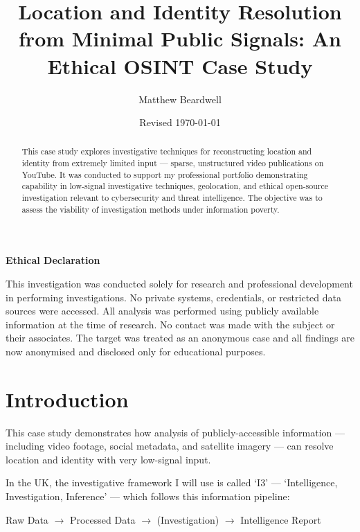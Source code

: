 \documentclass[a4paper,11pt]{report}
\title{Location and Identity Resolution from Minimal Public Signals: An Ethical OSINT Case Study}
\author{Matthew Beardwell}
\date{Revised \normaldate\today}
\begin{document}
\maketitle

\begin{abstract}
This case study explores investigative techniques for reconstructing location and identity from extremely limited input --- sparse, unstructured video publications on YouTube. It was conducted to support my professional portfolio demonstrating capability in low-signal investigative techniques, geolocation, and ethical open-source investigation relevant to cybersecurity and threat intelligence. The objective was to assess the viability of investigation methods under information poverty.
\end{abstract}

\begin{center}
    \textbf{Ethical Declaration}
\end{center}  

This investigation was conducted solely for research and professional development in performing investigations. No private systems, credentials, or restricted data sources were accessed. All analysis was performed using publicly available information at the time of research. No contact was made with the subject or their associates. The target was treated as an anonymous case and all findings are now anonymised and disclosed only for educational purposes.

\tableofcontents

\chapter{Introduction}

This case study demonstrates how analysis of publicly-accessible information --- including video footage, social metadata, and satellite imagery --- can resolve location and identity with very low-signal input.

In the UK, the investigative framework I will use is called `I3' --- `Intelligence, Investigation, Inference' --- which follows this information pipeline:

\vspace{0.5cm}
\begin{center}
Raw Data $\rightarrow$ Processed Data $\rightarrow$ (Investigation) $\rightarrow$ Intelligence Report
\end{center}
\vspace{0.5cm}
\end{document}
